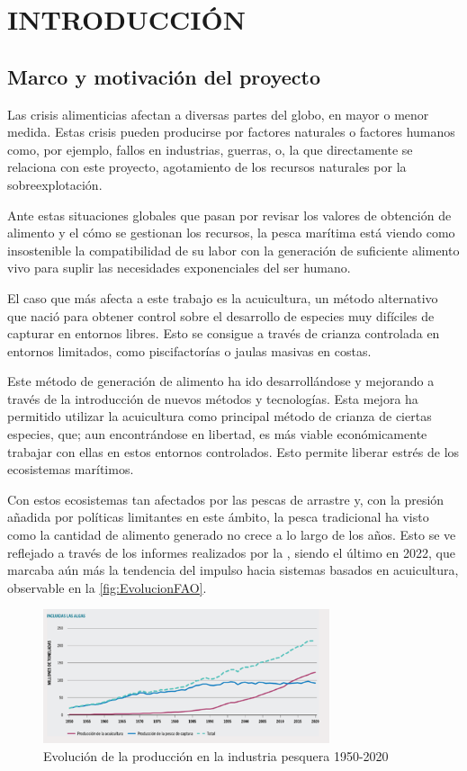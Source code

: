 \section{INTRODUCCIÓN}

\subsection{Marco y motivación del proyecto}

Las crisis alimenticias afectan a diversas partes del globo, en mayor o menor medida. Estas crisis pueden producirse por factores naturales o factores humanos como, por ejemplo, 
fallos en industrias, guerras, o, la que directamente se relaciona con este proyecto, agotamiento de los recursos naturales por la sobreexplotación.

Ante estas situaciones globales que pasan por revisar los valores de obtención de alimento y el cómo se gestionan los recursos, la pesca marítima está viendo como insostenible la 
compatibilidad de su labor con la generación de suficiente alimento vivo para suplir las necesidades exponenciales del ser humano.

El caso que más afecta a este trabajo es la acuicultura, un método alternativo que nació para obtener control sobre el desarrollo de especies muy difíciles de capturar en entornos 
libres. Esto se consigue a través de crianza controlada en entornos limitados, como piscifactorías o jaulas masivas en costas.

Este método de generación de alimento ha ido desarrollándose y mejorando a través de la introducción de nuevos métodos y tecnologías. Esta mejora ha permitido utilizar la acuicultura 
como principal método de crianza de ciertas especies, que; aun encontrándose en libertad, es más viable económicamente trabajar con ellas en estos entornos controlados. Esto permite liberar 
estrés de los ecosistemas marítimos.

Con estos ecosistemas tan afectados por las pescas de arrastre y, con la presión añadida por políticas limitantes en este ámbito, la pesca tradicional ha visto como la cantidad de alimento 
generado no crece a lo largo de los años. Esto se ve reflejado a través de los informes realizados por la \textit{}, siendo el último en 2022, que marcaba aún más la tendencia del 
impulso hacia sistemas basados en acuicultura, observable en la \autoref{fig:EvolucionFAO}.

\begin{figure}[h]
    \centering
    \includegraphics[width=0.75\textwidth]{images/2/EvolucionFAO.png}
    \caption{Evolución de la producción en la industria pesquera 1950-2020\cite{EstadoMundialPesca}}
    \label{fig:EvolucionFAO}
\end{figure}

